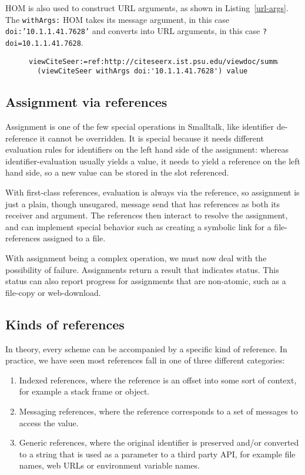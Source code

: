 \documentclass[preprint]{sigplanconf}
\begin{document}
HOM is also used to construct URL arguments, as shown in Listing~\ref{url-args}.  The {\tt withArgs:}
HOM takes its message argument, in this case {\tt doi:'10.1.1.41.7628'} and converts into URL arguments,
in this case {\tt ?doi=10.1.1.41.7628}.

\begin{figure}[htbp]
\begin{lstlisting}[style=numbers,label=url-args,caption=URL arguments via reference and higher order message.]
  viewCiteSeer:=ref:http://citeseerx.ist.psu.edu/viewdoc/summary.
  (viewCiteSeer withArgs doi:'10.1.1.41.7628') value
\end{lstlisting}
\end{figure}


\subsection{Assignment via references}

Assignment is one of the few special operations in Smalltalk, like identifier de-reference it cannot be overridden.
It is special because it needs different evaluation rules for identifiers on the left hand side of the assignment:
whereas identifier-evaluation usually yields a value, it needs to yield a reference on the left hand side, so
a new value can be stored in the slot referenced.

With first-class references, evaluation is always via the reference, so assignment is just a plain, though unsugared,
message send that has references as both its receiver and argument.  The references then interact to resolve
the assignment, and can implement special behavior such as creating a symbolic link for a file-references assigned
to a file.

With assignment being a complex operation, we must now deal with the possibility of failure.  Assignments 
return a result that indicates status.  This status can also report progress for assignments that are
non-atomic, such as a file-copy or web-download.



\subsection{Kinds of references}
\label{refkinds}
In theory, every scheme can be accompanied by a specific kind of reference.  In practice, we have 
seen most references fall in one of three different categories:

\begin{enumerate}
\item Indexed references, where the reference is an offset into some sort of context, for
	example a stack frame or object.
\item Messaging references, where the reference corresponds to a set of messages to
	access the value.
\item Generic references, where the original identifier is preserved and/or converted to
	a string that is used as a parameter to a third party API, for example file names,
	web URLs or environment variable names.
\end{enumerate}
\end{document}
